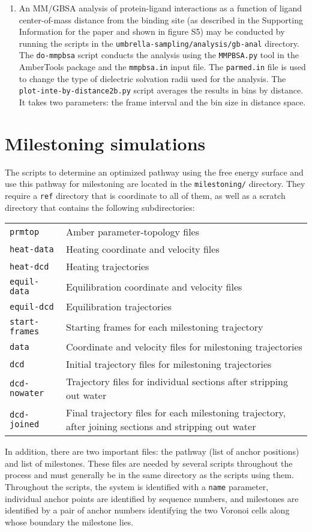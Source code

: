 \documentclass{article}      %
\begin{document}
\begin{enumerate}
\item An MM/GBSA analysis of protein-ligand interactions as a function of ligand center-of-mass distance from the binding site (as described in the Supporting Information for the paper and shown in figure S5) may be conducted by running the scripts in the \verb+umbrella-sampling/analysis/gb-anal+ directory.  The \verb+do-mmpbsa+ script conducts the analysis using the \verb+MMPBSA.py+ tool in the AmberTools package and the \verb+mmpbsa.in+ input file.  The \verb+parmed.in+ file is used to change the type of dielectric solvation radii used for the analysis.  The \verb+plot-inte-by-distance2b.py+ script averages the results in bins by distance.  It takes two parameters: the frame interval and the bin size in distance space.

\end{enumerate}


\section{Milestoning simulations}

The scripts to determine an optimized pathway using the free energy surface and use this pathway for milestoning are located in the \verb+milestoning/+ directory.  They require a \verb+ref+ directory that is coordinate to all of them, as well as a scratch directory that contains the following subdirectories: \\
\begin{tabular}{|l|l|}
\hline
\verb+prmtop+ & Amber parameter-topology files \\
\verb+heat-data+ & Heating coordinate and velocity files \\
\verb+heat-dcd+ & Heating trajectories \\
\verb+equil-data+ & Equilibration coordinate and velocity files \\
\verb+equil-dcd+ & Equilibration trajectories \\
\verb+start-frames+ & Starting frames for each milestoning trajectory \\
\verb+data+ & Coordinate and velocity files for milestoning trajectories \\
\verb+dcd+ & Initial trajectory files for milestoning trajectories \\
\verb+dcd-nowater+ & Trajectory files for individual sections after stripping out water \\
\verb+dcd-joined+ & Final trajectory files for each milestoning trajectory, after joining sections and stripping out water\\
\hline
\end{tabular}
In addition, there are two important files: the pathway (list of anchor positions) and list of milestones.  These files are needed by several scripts throughout the process and must generally be in the same directory as the scripts using them.  Throughout the scripts, the system is identified with a \verb+name+ parameter, individual anchor points are identified by sequence numbers, and milestones are identified by a pair of anchor numbers identifying the two Voronoi cells along whose boundary the milestone lies.
\end{document}
